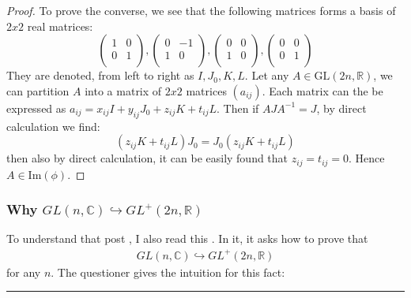 \documentclass{article}
\numberwithin{equation}{subsection} %
\theoremstyle{definition}
\begin{document}
\begin{proof}
            To prove the converse, we see that the following matrices forms
            a basis of $2x2$ real matrices:
            $$ \left( \begin{array}{cc}
             1 & 0 \\
             0 & 1 \\ \end{array}
            \right),\left( \begin{array}{cc}
             0 & -1 \\
             1 & 0 \\ \end{array}
            \right),\left( \begin{array}{cc}
             0 & 0 \\
             1 & 0 \\ \end{array}
            \right),\left( \begin{array}{cc}
             0 & 0 \\
             0 & 1 \\ \end{array} \right) $$
            They are denoted, from left to right as $I,J_0,K,L$.
            Let any $A\in \mathrm{GL}(2n,\mathbb{R})$, we can partition $A$
            into a matrix of $2x2$ matrices $(a_{ij})$. Each matrix can
            the be expressed as $a_{ij}=x_{ij}I+y_{ij}J_0+z_{ij}K+t_{ij}L$.
            Then if $AJA^{-1}=J$, by direct calculation we find:
            $$ (z_{ij}K+t_{ij}L)J_0=J_0(z_{ij}K+t_{ij}L)$$
            then also by direct calculation, it can be easily found that
            $z_{ij}=t_{ij}=0$. Hence $A\in \mathrm{Im}(\phi)$.
        \end{proof}
        
        \subsubsection{Why \texorpdfstring{
                $GL(n, \mathbb{C}) \hookrightarrow GL^+(2n,\mathbb{R})$
                }{}
            }
        
        To understand that post \cite{math.se_1}, I also read this
        \cite{math.se_2}. In it, it asks how to prove that 
        \begin{align}
            \label{eq:sec.1.1.2_why_glnc_injectInto_positive_comp}
            GL(n, \mathbb{C}) \hookrightarrow GL^+(2n,\mathbb{R})
        \end{align}
        for any $n$. The questioner gives the intuition for this fact:
        \begin{center}\noindent\rule{8cm}{0.4pt}\end{center}
        
\end{document}
